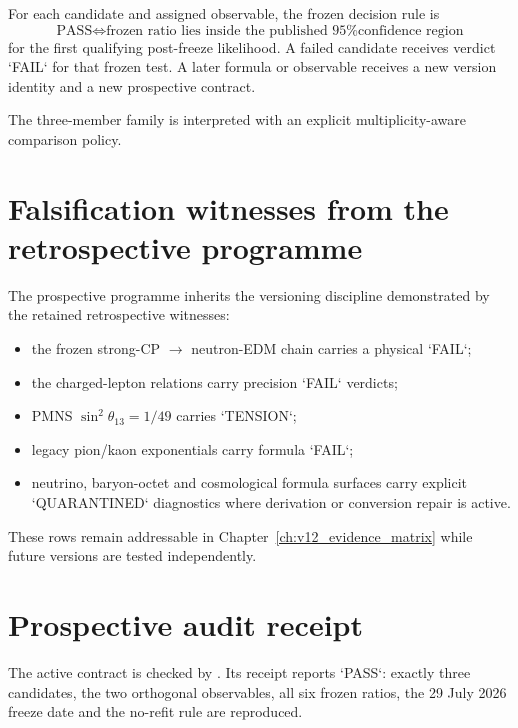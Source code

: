 For each candidate and assigned observable, the frozen decision rule is
\begin{equation}
\boxed{
\text{PASS}
\iff
\text{frozen ratio lies inside the published 95\% confidence region}
}
\end{equation}
for the first qualifying post-freeze likelihood. A failed candidate receives verdict `FAIL` for that frozen test. A later formula or observable receives a new version identity and a new prospective contract.

The three-member family is interpreted with an explicit multiplicity-aware comparison policy.

\section{Falsification witnesses from the retrospective programme}

The prospective programme inherits the versioning discipline demonstrated by the retained retrospective witnesses:
\begin{itemize}
\item the frozen strong-CP $\to$ neutron-EDM chain carries a physical `FAIL`;
\item the charged-lepton relations carry precision `FAIL` verdicts;
\item PMNS $\sin^2\theta_{13}=1/49$ carries `TENSION`;
\item legacy pion/kaon exponentials carry formula `FAIL`;
\item neutrino, baryon-octet and cosmological formula surfaces carry explicit `QUARANTINED` diagnostics where derivation or conversion repair is active.
\end{itemize}
These rows remain addressable in Chapter~\ref{ch:v12_evidence_matrix} while future versions are tested independently.

\section{Prospective audit receipt}

The active contract is checked by
.
Its receipt
reports `PASS`: exactly three candidates, the two orthogonal observables, all six frozen ratios, the 29 July 2026 freeze date and the no-refit rule are reproduced.

\clearpage

